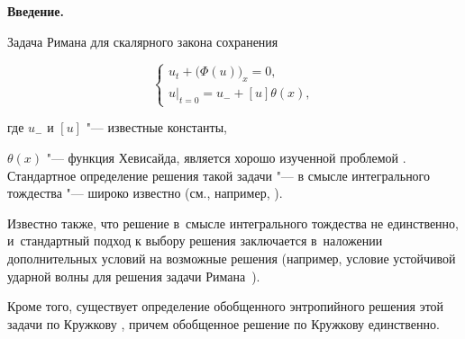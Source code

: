 
\date{}








\renewcommand{\JournalDataOnline}{\displaydate{paline}}




\makerutitle



\renewcommand{\baselinestretch}{0.96}



\newpage



{\bf Введение.}

Задача Римана для скалярного закона сохранения

\begin{equation}

\label{eq-classic-Cauchy-1}

\left\{\begin{array}{l}

u_t+\bigl(\Phi(u)\bigr)_x=0,\\ 

u|_{t=0}=u_-+[u]\theta(x),

\end{array}\right.

\end{equation}

где $u_{-}$ и $[u]$ "--- известные константы, 

$\theta(x)$ "--- функция Хевисайда, является хорошо изученной проблемой \cite{Bressan, Dafermos, GodunovRomenskij}. Стандартное определение решения такой задачи "--- в смысле интегрального тождества "--- широко известно (см., например, \cite{Evans}). 

Известно также, что решение в~смысле интегрального тождества не единственно, и~стандартный подход к выбору решения заключается в~наложении дополнительных условий на возможные решения (например, условие устойчивой ударной волны для решения задачи Римана~\cite{Lax, Colella}). 

Кроме того, существует определение обобщенного энтропийного решения этой задачи по Кружкову \cite{Kruzhkov}, причем обобщенное решение по Кружкову единственно.



